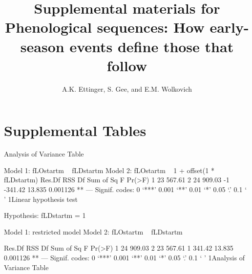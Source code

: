 \documentclass{article}
\begin{document}

\title{Supplemental materials for \\ Phenological sequences: How early-season events define those that follow} 
\author{A.K. Ettinger, S. Gee, and E.M. Wolkovich}
\maketitle  %
\renewcommand{\thetable}{S\arabic{table}}
\renewcommand{\thefigure}{S\arabic{figure}}





%

\section* {Supplemental Tables}
Analysis of Variance Table

Model 1: fLOstartm ~ fLDstartm
Model 2: fLOstartm ~ 1 + offset(1 * fLDstartm)
  Res.Df    RSS Df Sum of Sq      F   Pr(>F)   
1     23 567.61                                
2     24 909.03 -1   -341.42 13.835 0.001126 **
---
Signif. codes:  0 ‘***’ 0.001 ‘**’ 0.01 ‘*’ 0.05 ‘.’ 0.1 ‘ ’ 1Linear hypothesis test

Hypothesis:
fLDstartm = 1

Model 1: restricted model
Model 2: fLOstartm ~ fLDstartm

  Res.Df    RSS Df Sum of Sq      F   Pr(>F)   
1     24 909.03                                
2     23 567.61  1    341.42 13.835 0.001126 **
---
Signif. codes:  0 ‘***’ 0.001 ‘**’ 0.01 ‘*’ 0.05 ‘.’ 0.1 ‘ ’ 1Analysis of Variance Table
\end{document}
